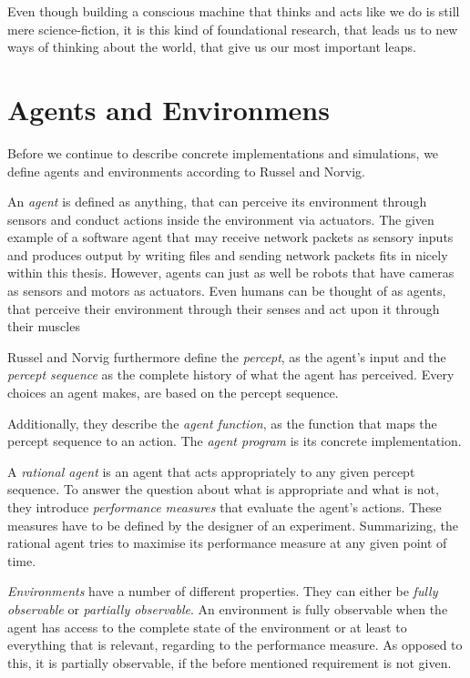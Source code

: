 Even though building a conscious machine that thinks and acts like we do is still mere science-fiction, it is this kind of foundational research, that leads us to new ways of thinking about the world, that give us our most important leaps.
    
    \section{Agents and Environmens}
Before we continue to describe concrete implementations and simulations, we define agents and environments according to Russel and Norvig.~\cite{russell2009artificial} 

An \emph{agent} is defined as anything, that can perceive its environment through sensors and conduct actions inside the environment via actuators. The given example of a software agent that may receive network packets as sensory inputs and produces output by writing files and sending network packets fits in nicely within this thesis. However, agents can just as well be robots that have cameras as sensors and motors as actuators. Even humans can be thought of as agents, that perceive their environment through their senses and act upon it through their muscles

Russel and Norvig furthermore define the \emph{percept}, as the agent's input and the \emph{percept sequence} as the complete history of what the agent has perceived. Every choices an agent makes, are based on the percept sequence.

Additionally, they describe the \emph{agent function}, as the function that maps the percept sequence to an action. The \emph{agent program} is its concrete implementation.

A \emph{rational agent} is an agent that acts appropriately to any given percept sequence. To answer the question about what is appropriate and what is not, they introduce \emph{performance measures} that evaluate the agent's actions. These measures have to be defined by the designer of an experiment. Summarizing, the rational agent tries to maximise its performance measure at any given point of time.

\emph{Environments} have a number of different properties. They can either be \emph{fully observable} or \emph{partially observable}. An environment is fully observable when the agent has access to the complete state of the environment or at least to everything that is relevant, regarding to the performance measure. As opposed to this, it is partially observable, if the before mentioned requirement is not given.

